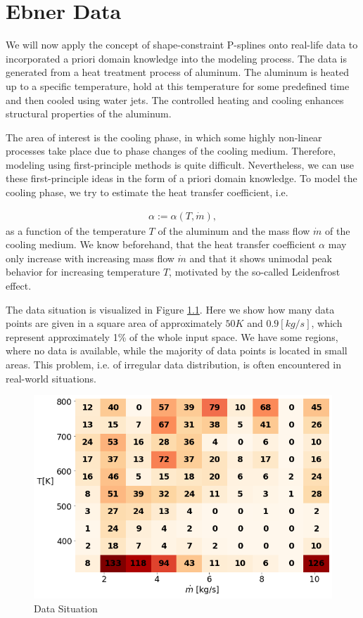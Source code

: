 \chapter{Ebner Data} \label{cha:real-world-application}

We will now apply the concept of shape-constraint P-splines onto real-life data to incorporated a priori domain knowledge into the modeling process. The data is generated from a heat treatment process of aluminum. The aluminum is heated up to a specific temperature, hold at this temperature for some predefined time and then cooled using water jets. The controlled heating and cooling enhances structural properties of the aluminum.

The area of interest is the cooling phase, in which some highly non-linear processes take place due to phase changes of the cooling medium. Therefore, modeling using first-principle methods is quite difficult. Nevertheless, we can use these first-principle ideas in the form of a priori domain knowledge. To model the cooling phase, we try to estimate the heat transfer coefficient, i.e.

\begin{align}
	\alpha := \alpha(T, \dot m),
\end{align}
%
as a function of the temperature $T$ of the aluminum and the mass flow $\dot m$ of the cooling medium. We know beforehand, that the heat transfer coefficient $\alpha$ may only increase with increasing mass flow $\dot m$ and that it shows unimodal peak behavior for increasing temperature $T$, motivated by the so-called Leidenfrost effect. \cite{mayinger2013stromung} \cite{baehr2006heatandmasstransfer} 

The data situation is visualized in Figure \ref{fig:ebner_data_situation}. Here we show how many data points are given in a square area of approximately $50 K$ and $0.9 [kg/s]$, which represent approximately 1\% of the whole input space. We have some regions, where no data is available, while the majority of data points is located in small areas. This problem, i.e. of irregular data distribution, is often encountered in real-world situations. 

\begin{figure}[H]
	\centering
	\includegraphics[width=0.8\columnwidth]{graphics/pgfplots/cha5/data_distribution.png}
	\caption{Data Situation}
	\label{fig:ebner_data_situation}
\end{figure}

